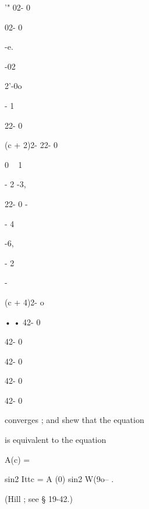 '" 02- 0


02- 0


-e.


-02

2'-0o


- 1

22- 0


(c + 2)2- 22- 0


 0 ~ 1


- 2 -3,


22- 0 -


- 4


-6,


- 2


-


(c + 4)2- o


• • 42- 0


42- 0


42- 0


42- 0


42- 0



converges ; and shew that the equation



is equivalent to the equation



A(c) =



sin2 Ittc = A (0) sin2 W(9o-- .



(Hill ; see § 19-42.)

